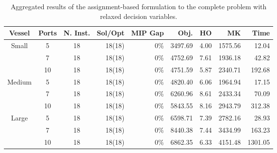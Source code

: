\documentclass[preprint,12pt,authoryear]{elsarticle}
\begin{document}
\begin{table}[]
    \centering
    \scriptsize
    \caption{Aggregated results of the assignment-based formulation to the complete problem with relaxed decision variables.}
    \label{tab:mp_full_relatex}
    \begin{tabular}{cccrrrrrr}
        \textbf{Vessel}         & \textbf{Ports} & \textbf{N. Inst.} & \textbf{Sol/Opt} & \textbf{MIP Gap} & \textbf{Obj.} & \textbf{HO} & \textbf{MK} & \textbf{Time} \\ \hline
        \multirow{3}{*}{Small}  & 5              & 18                & 18(18)           & 0\%              & 3497.69       & 4.00        & 1575.56     & 12.04         \\
                                & 7              & 18                & 18(18)           & 0\%              & 4752.69       & 7.61        & 1936.18     & 42.82         \\
                                & 10             & 18                & 18(18)           & 0\%              & 4751.59       & 5.87        & 2340.71     & 192.68        \\ \hline
        \multirow{3}{*}{Medium} & 5              & 18                & 18(18)           & 0\%              & 4820.40       & 6.06        & 1964.94     & 17.15         \\
                                & 7              & 18                & 18(18)           & 0\%              & 6260.96       & 8.61        & 2433.34     & 70.09         \\
                                & 10             & 18                & 18(18)           & 0\%              & 5843.55       & 8.16        & 2943.79     & 312.38        \\ \hline
        \multirow{3}{*}{Large}  & 5              & 18                & 18(18)           & 0\%              & 6598.71       & 7.39        & 2782.16     & 28.93         \\
                                & 7              & 18                & 18(18)           & 0\%              & 8440.38       & 7.44        & 3434.99     & 163.23        \\
                                & 10             & 18                & 18(18)           & 0\%              & 6862.35       & 6.33        & 4151.48     & 1301.05       \\ \hline
        \end{tabular}
\end{table}
\end{document}
